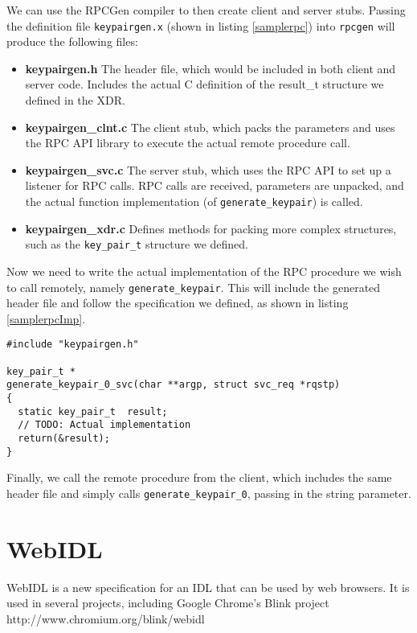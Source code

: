 We can use the RPCGen compiler to then create client and server stubs. Passing the definition file \verb+keypairgen.x+ (shown in listing \ref{samplerpc}) into \verb+rpcgen+ will produce the following files:

\begin{itemize}
	\item \textbf{keypairgen.h} The header file, which would be included in both client and server code. Includes the actual C definition of the result\_t structure we defined in the XDR.
	\item \textbf{keypairgen\_clnt.c} The client stub, which packs the parameters and uses the RPC API library to execute the actual remote procedure call.
	\item \textbf{keypairgen\_svc.c} The server stub, which uses the RPC API to set up a listener for RPC calls. RPC calls are received, parameters are unpacked, and the actual function implementation (of \verb+generate_keypair+) is called.
	\item \textbf{keypairgen\_xdr.c} Defines methods for packing more complex structures, such as the \verb+key_pair_t+ structure we defined.
\end{itemize}

Now we need to write the actual implementation of the RPC procedure we wish to call remotely, namely \verb+generate_keypair+. This will include the generated header file and follow the specification we defined, as shown in listing \ref{samplerpcImp}. \\


\begin{lstlisting}
#include "keypairgen.h"

key_pair_t *
generate_keypair_0_svc(char **argp, struct svc_req *rqstp)
{
  static key_pair_t  result;
  // TODO: Actual implementation
  return(&result);
}
\end{lstlisting}

Finally, we call the remote procedure from the client, which includes the same header file and simply calls \verb+generate_keypair_0+, passing in the string parameter.



\section{WebIDL}
WebIDL is a new specification for an IDL that can be used by web browsers. It is used in several projects, including Google Chrome's Blink project http://www.chromium.org/blink/webidl 

